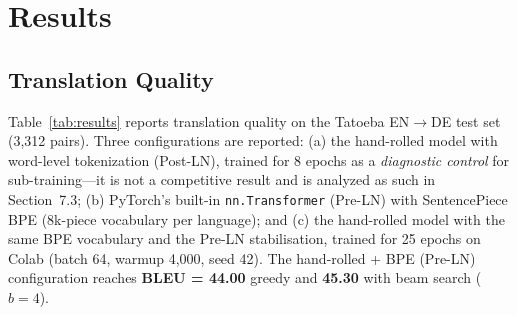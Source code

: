 \documentclass[10pt]{article}
\begin{document}
\section{Results}

\subsection{Translation Quality}

Table~\ref{tab:results} reports translation quality on the Tatoeba EN$\rightarrow$DE test set (3,312 pairs). Three configurations are reported: (a) the hand-rolled model with word-level tokenization (Post-LN), trained for 8 epochs as a \textit{diagnostic control} for sub-training---it is not a competitive result and is analyzed as such in Section~7.3; (b) PyTorch's built-in \texttt{nn.Transformer} (Pre-LN) with SentencePiece BPE (8k-piece vocabulary per language); and (c) the hand-rolled model with the same BPE vocabulary and the Pre-LN stabilisation, trained for 25 epochs on Colab (batch 64, warmup 4{,}000, seed 42). The hand-rolled + BPE (Pre-LN) configuration reaches \textbf{BLEU = 44.00} greedy and \textbf{45.30} with beam search ($b=4$).

\begin{table}[htbp]
\centering
\footnotesize
\setlength{\tabcolsep}{2.5pt}
\caption{Results on the Tatoeba EN$\rightarrow$DE test set ($n = 3{,}312$); corpus-level sacrebleu scores. Row 1 is the word-level Post-LN diagnostic/control run (BLEU = 0.38, BP = 0.593; Sections~5.3 and~7.3), not a competitive configuration. The main configuration reaches greedy BLEU = 44.00 (71.3/48.9/37.3/29.3, BP = 0.995) and beam$=4$ BLEU = 45.30 (72.4/50.7/39.0/30.9, BP = 0.987). The baseline and the hand-rolled model share architecture, data, and seed but differ in batch size and warmup; see Section~6.7 for the attribution caveat.}
\label{tab:results}
\end{table}
\end{document}
